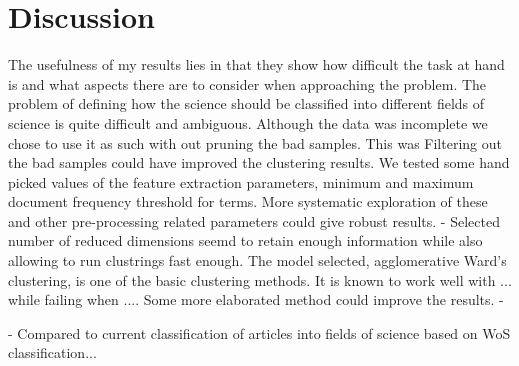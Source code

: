 \chapter{Discussion}
\label{chapter:discussion}

The usefulness of my results lies in that they show how difficult
the task at hand is and what aspects there are to consider when
approaching the problem.
The problem of defining how the science should be classified into
different fields of science is quite difficult and ambiguous.
Although the data was incomplete we chose to use it as such with out 
pruning the bad samples. This was 
Filtering out the bad samples could have improved the clustering 
results.
We tested some hand picked values of the feature extraction 
parameters, minimum and maximum document frequency threshold for 
terms. More systematic exploration of these and other 
pre-processing related parameters could give robust results.
- 
Selected number of reduced dimensions seemd to retain enough
information while also allowing to run clustrings fast enough.
The model selected, agglomerative Ward's clustering, is one of the
basic clustering methods. It is known to work well with ...
while failing when ....
Some more elaborated method could improve the results. 
- 

- Compared to current classification of articles into fields of 
science based on WoS classification...



